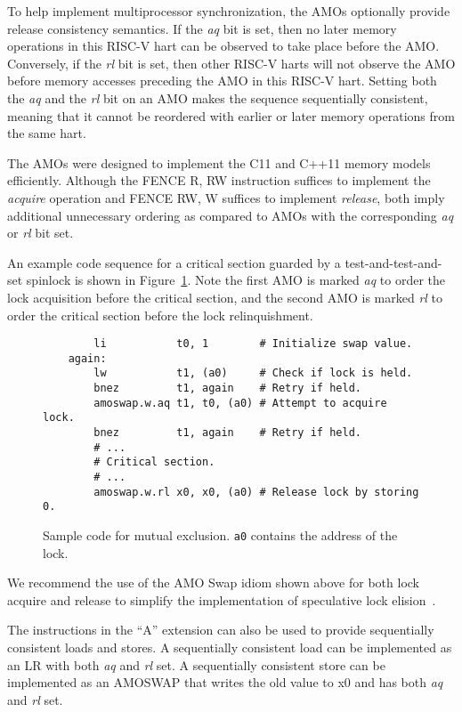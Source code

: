 To help implement multiprocessor synchronization, the AMOs optionally
provide release consistency semantics.  If the {\em aq} bit is set,
then no later memory operations in this RISC-V hart can be observed
to take place before the AMO.
Conversely, if the {\em rl} bit is set, then other
RISC-V harts will not observe the AMO before memory accesses
preceding the AMO in this RISC-V hart.  Setting both the {\em aq} and the {\em
rl} bit on an AMO makes the sequence sequentially consistent, meaning that
it cannot be reordered with earlier or later memory operations from the same
hart.

\begin{commentary}
The AMOs were designed to implement the C11 and C++11 memory models
efficiently.  Although the FENCE R, RW instruction suffices to
implement the {\em acquire} operation and FENCE RW, W suffices to
implement {\em release}, both imply additional unnecessary ordering as
compared to AMOs with the corresponding {\em aq} or {\em rl} bit set.
\end{commentary}

An example code sequence for a critical section guarded by a
test-and-test-and-set spinlock is shown in Figure~\ref{critical}.  Note the
first AMO is marked {\em aq} to order the lock acquisition before the
critical section, and the second AMO is marked {\em rl} to order
the critical section before the lock relinquishment.

\begin{figure}[h!]
\begin{center}
\begin{verbatim}
        li           t0, 1        # Initialize swap value.
    again:
        lw           t1, (a0)     # Check if lock is held.
        bnez         t1, again    # Retry if held.
        amoswap.w.aq t1, t0, (a0) # Attempt to acquire lock.
        bnez         t1, again    # Retry if held.
        # ...
        # Critical section.
        # ...
        amoswap.w.rl x0, x0, (a0) # Release lock by storing 0.
\end{verbatim}
\end{center}
\caption{Sample code for mutual exclusion.  {\tt a0} contains the address of the lock.}
\label{critical}
\end{figure}

\begin{commentary}
We recommend the use of the AMO Swap idiom shown above for both lock
acquire and release to simplify the implementation of speculative lock
elision~\cite{Rajwar:2001:SLE}.
\end{commentary}

The instructions in the ``A'' extension can also be used to provide
sequentially consistent loads and stores.  A sequentially consistent load can
be implemented as an LR with both {\em aq} and {\em rl} set. A sequentially
consistent store can be implemented as an AMOSWAP that writes the old value to
x0 and has both {\em aq} and {\em rl} set.
